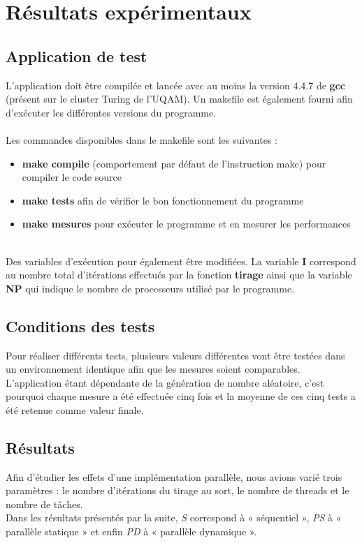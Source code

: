 \documentclass[a4paper,12pt]{article}
\begin{document}
\section{Résultats expérimentaux}

\subsection{Application de test}
L'application doit être compilée et lancée avec au moins la version 4.4.7 de \textbf{gcc} (présent sur le cluster Turing de l’UQAM). Un makefile est également fourni afin d'exécuter les différentes versions du programme.\\\\
Les commandes disponibles dans le makefile sont les suivantes :
\begin{itemize}
	\item{\textbf{make compile}} (comportement par défaut de l'instruction make) pour compiler le code source
	\item{\textbf{make tests}} afin de vérifier le bon fonctionnement du programme
	\item{\textbf{make mesures}} pour exécuter le programme et en mesurer les performances
\end{itemize}~~\\
Des variables d'exécution pour également être modifiées. La variable \textbf{I} correspond au nombre total d'itérations effectués par la fonction \textbf{tirage} ainsi que la variable \textbf{NP} qui indique le nombre de processeurs utilisé par le programme.


\subsection{Conditions des tests}
Pour réaliser différents tests, plusieurs valeurs différentes vont être testées dans un environnement identique afin que les mesures soient comparables. L'application étant dépendante de la génération de nombre aléatoire, c'est pourquoi chaque mesure a été effectuée cinq fois et la moyenne de ces cinq tests a été retenue comme valeur finale. 

\subsection{Résultats}
Afin d'étudier les effets d'une implémentation parallèle, nous avions varié trois paramètres : le nombre d'itérations du tirage au sort, le nombre de threads et le nombre de tâches. \\
Dans les résultats présentés par la suite, \textit{S} correspond à « séquentiel », \textit{PS} à « parallèle statique » et enfin \textit{PD} à « parallèle dynamique ». 
\end{document}
